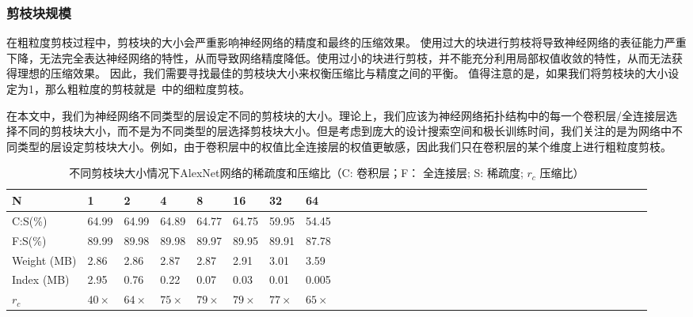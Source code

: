 \subsubsection{剪枝块规模}

在粗粒度剪枝过程中，剪枝块的大小会严重影响神经网络的精度和最终的压缩效果。
使用过大的块进行剪枝将导致神经网络的表征能力严重下降，无法完全表达神经网络的特性，从而导致网络精度降低。使用过小的块进行剪枝，并不能充分利用局部权值收敛的特性，从而无法获得理想的压缩效果。
因此，我们需要寻找最佳的剪枝块大小来权衡压缩比与精度之间的平衡。
值得注意的是，如果我们将剪枝块的大小设定为1，那么粗粒度的剪枝就是~\cite{han2015learning}中的细粒度剪枝。

在本文中，我们为神经网络不同类型的层设定不同的剪枝块的大小。理论上，我们应该为神经网络拓扑结构中的每一个卷积层/全连接层选择不同的剪枝块大小，而不是为不同类型的层选择剪枝块大小。但是考虑到庞大的设计搜索空间和极长训练时间，我们关注的是为网络中不同类型的层设定剪枝块大小。例如，由于卷积层中的权值比全连接层的权值更敏感，因此我们只在卷积层的某个维度上进行粗粒度剪枝。

\begin{table}[h]
\centering
\caption{ 不同剪枝块大小情况下AlexNet网络的稀疏度和压缩比（C: 卷积层；F： 全连接层; S: 稀疏度; $r_c$ 压缩比）}
\label{tab:blocksize}
\begin{tabular}{lll@{~}llll@{~}llll@{~}llll@{~~}llll@{~~}llll@{~~}llll@{~~}lllllllll}
\toprule
N  				& 1 	&  2		& 4			& 8			& 16		& 32 		&64		\\
\midrule
C:S(\%)			& 64.99 &64.99		&64.89		&64.77		&64.75		&59.95		&54.45 	\\
F:S(\%) 		& 89.99	&89.98		&89.98		&89.97		&89.95		&89.91		&87.78	\\
Weight (MB)     & 2.86 	&2.86		&2.87		&2.87		&2.91		&3.01		&3.59	\\
Index (MB)      & 2.95	&0.76		&0.22		&0.07		&0.03		&0.01		&0.005	\\
$r_c$ 			& $40\times$ 	&$64\times$		&$75\times$		&$79\times$		&$79\times$		&$77\times$		&$65\times$	\\
\bottomrule
\end{tabular}
\end{table}

